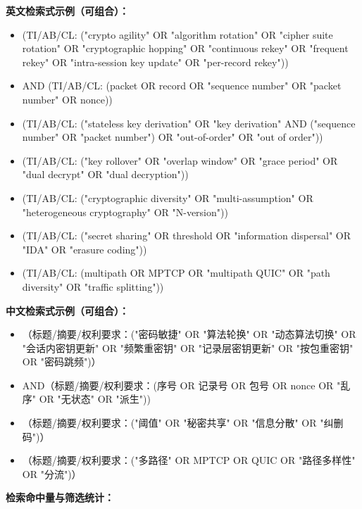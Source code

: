 ﻿\documentclass[12pt,a4paper]{article}
\begin{document}
\noindent\textbf{英文检索式示例（可组合）：}
\begin{itemize}[leftmargin=2em]
    \item (TI/AB/CL: ("crypto agility" OR "algorithm rotation" OR "cipher suite rotation" OR "cryptographic hopping" OR "continuous rekey" OR "frequent rekey" OR "intra-session key update" OR "per-record rekey"))
    \item AND (TI/AB/CL: (packet OR record OR "sequence number" OR "packet number" OR nonce))
    \item (TI/AB/CL: ("stateless key derivation" OR "key derivation" AND ("sequence number" OR "packet number") OR "out-of-order" OR "out of order"))
    \item (TI/AB/CL: ("key rollover" OR "overlap window" OR "grace period" OR "dual decrypt" OR "dual decryption"))
    \item (TI/AB/CL: ("cryptographic diversity" OR "multi-assumption" OR "heterogeneous cryptography" OR "N-version"))
    \item (TI/AB/CL: ("secret sharing" OR threshold OR "information dispersal" OR "IDA" OR "erasure coding"))
    \item (TI/AB/CL: (multipath OR MPTCP OR "multipath QUIC" OR "path diversity" OR "traffic splitting"))
\end{itemize}

\noindent\textbf{中文检索式示例（可组合）：}
\begin{itemize}[leftmargin=2em]
    \item （标题/摘要/权利要求：("密码敏捷" OR "算法轮换" OR "动态算法切换" OR "会话内密钥更新" OR "频繁重密钥" OR "记录层密钥更新" OR "按包重密钥" OR "密码跳频")）
    \item AND（标题/摘要/权利要求：(序号 OR 记录号 OR 包号 OR nonce OR "乱序" OR "无状态" OR "派生"))
    \item （标题/摘要/权利要求：("阈值" OR "秘密共享" OR "信息分散" OR "纠删码")）
    \item （标题/摘要/权利要求：("多路径" OR MPTCP OR QUIC OR "路径多样性" OR "分流")）
\end{itemize}

\vspace{0.5em}
\noindent\textbf{检索命中量与筛选统计：}
\end{document}
